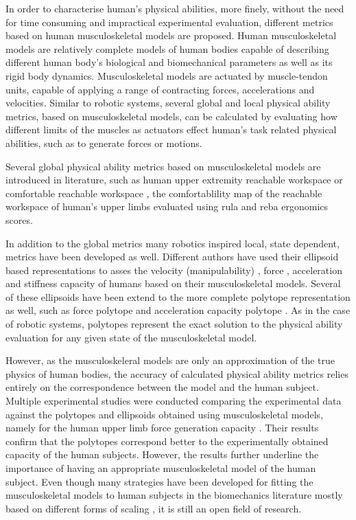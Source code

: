 In order to characterise human's physical abilities, more finely, without the need for time consuming and impractical experimental evaluation, different metrics based on human musculoskeletal models are proposed. Human musculoskeletal models are relatively complete models of human bodies capable of describing different human body's biological and biomechanical parameters as well as its rigid body dynamics. Musculoskeletal models are actuated by muscle-tendon units, capable of applying a range of contracting forces, accelerations and velocities. Similar to robotic systems, several global and local physical ability metrics, based on musculoskeletal models, can be calculated by evaluating how different limits of the muscles as actuators effect human's task related physical abilities, such as to generate forces or motions. 

Several global physical ability metrics based on musculoskeletal models are introduced in literature, such as human upper extremity reachable workspace \cite{Lenarcic1994,Kurillo2013} or comfortable reachable workspace \cite{Figueredo2021}, the comfortablility map of the reachable workspace of human's upper limbs evaluated using \gls{rula} and \gls{reba} ergonomics scores.  

In addition to the global metrics many robotics inspired local, state dependent, metrics have been developed as well. Different authors have used their ellipsoid based representations to asses the velocity (manipulability) \cite{Rezzoug2012manipulability}, force \cite{rezzoug_application_2012, lazinica_higher_2010}, acceleration \cite{khatib2009robotics} and stiffness \cite{Artemiadis2010} capacity of humans based on their musculoskeletal models. Several of these ellipsoids have been extend to the more complete polytope representation as well, such as force polytope \cite{lazinica_higher_2010, rezzoug_application_2012, carmichael_estimating_2013} and acceleration capacity polytope \cite{khatib2009robotics, demircan2012muscle}. As in the case of robotic systems, polytopes represent the exact solution to the physical ability evaluation for any given state of the musculoskeletal model. 

However, as the musculoskeleral models are only an approximation of the true physics of human bodies, the accuracy of calculated physical ability metrics relies entirely on the correspondence between the model and the human subject. Multiple experimental studies were conducted comparing the experimental data against the polytopes and ellipsoids obtained using musculoskeletal models, namely for the human upper limb force generation capacity \cite{biomechanics1010008, HERNANDEZ2015,lazinica_higher_2010}. Their results confirm that the polytopes correspond better to the experimentally obtained capacity of the human subjects. However, the results further underline the importance of having an appropriate musculoskeletal model of the human subject. Even though many strategies have been developed for fitting the musculoskeletal models to human subjects in the biomechanics literature mostly based on different forms of scaling \cite{Lund2015, Ziyun2019}, it is still an open field of research. 

